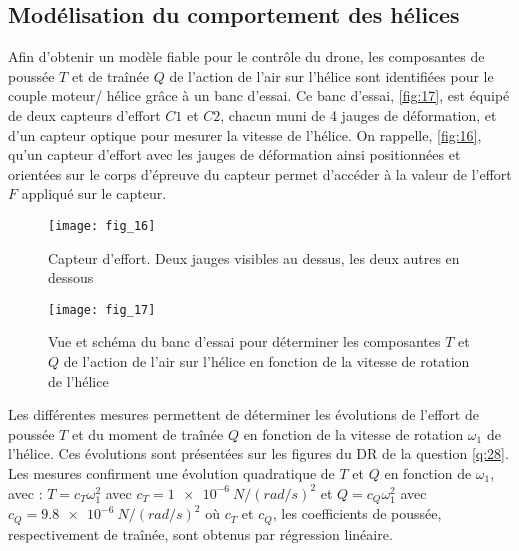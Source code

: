 \ifprof
\begin{corrige}
\end{corrige}
\else
\fi

\subsection{Modélisation du comportement des hélices}
Afin d’obtenir un modèle fiable pour le contrôle du drone, les composantes de poussée
$T$ et de traînée $Q$ de l’action de l’air sur l’hélice sont identifiées pour le couple moteur/
hélice grâce à un banc d’essai. Ce banc d’essai, \autoref{fig:17}, est équipé de deux capteurs
d’effort $C1$ et $C2$, chacun muni de 4 jauges de déformation, et d’un capteur optique pour
mesurer la vitesse de l’hélice. On rappelle, \autoref{fig:16}, qu’un capteur d’effort avec les jauges
de déformation ainsi positionnées et orientées sur le corps d’épreuve du capteur permet
d’accéder à la valeur de l’effort $F$ appliqué sur le capteur.


\ifprof
\begin{corrige}
\end{corrige}
\else
\fi

\begin{figure}[H]
\centering
\texttt{[image: fig\_16]}
\caption{\label{fig:16} Capteur d’effort. Deux jauges visibles au dessus, les deux autres en dessous}
\end{figure}

\begin{figure}[H]
\centering
\texttt{[image: fig\_17]}
\caption{\label{fig:17} Vue et schéma du banc d’essai pour déterminer les composantes $T$ et $Q$ de
l’action de l’air sur l’hélice en fonction de la vitesse de rotation de l’hélice}
\end{figure}

Les différentes mesures permettent de déterminer les évolutions de l’effort de poussée $T$ et
du moment de traînée $Q$ en fonction de la vitesse de rotation $\omega_1$ de l’hélice. Ces évolutions
sont présentées sur les figures du DR de la question \ref{q:28}. Les mesures confirment une évolution
quadratique de $T$ et $Q$ en fonction de $\omega_1$, avec :
$T = c_T \omega_1^2$ avec $c_T = \SI{1e-6}{N/(rad/s)^2}$ et
$Q = c_Q \omega_1^2$ avec $c_Q = \SI{9.8e-6}{N/(rad/s)^2}$ 
où $c_T$ et $c_Q$, les coefficients de poussée, respectivement de traînée, sont obtenus par régression linéaire.


